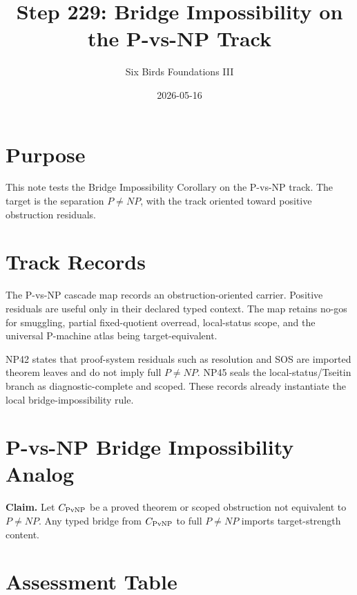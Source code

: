 \documentclass{article}
\title{Step 229: Bridge Impossibility on the P-vs-NP Track}
\author{Six Birds Foundations III}
\date{2026-05-16}
\begin{document}
\maketitle

\section{Purpose}

This note tests the Bridge Impossibility Corollary on the P-vs-NP track. The target is the separation \(P\ne NP\), with the track oriented toward positive obstruction residuals.

\section{Track Records}

The P-vs-NP cascade map records an obstruction-oriented carrier. Positive residuals are useful only in their declared typed context. The map retains no-gos for smuggling, partial fixed-quotient overread, local-status scope, and the universal P-machine atlas being target-equivalent.

NP42 states that proof-system residuals such as resolution and SOS are imported theorem leaves and do not imply full \(P\ne NP\). NP45 seals the local-status/Tseitin branch as diagnostic-complete and scoped. These records already instantiate the local bridge-impossibility rule.

\section{P-vs-NP Bridge Impossibility Analog}

\textbf{Claim.} Let \(C_{\rm PvNP}\) be a proved theorem or scoped obstruction not equivalent to \(P\ne NP\). Any typed bridge from \(C_{\rm PvNP}\) to full \(P\ne NP\) imports target-strength content.

\section{Assessment Table}
\end{document}
